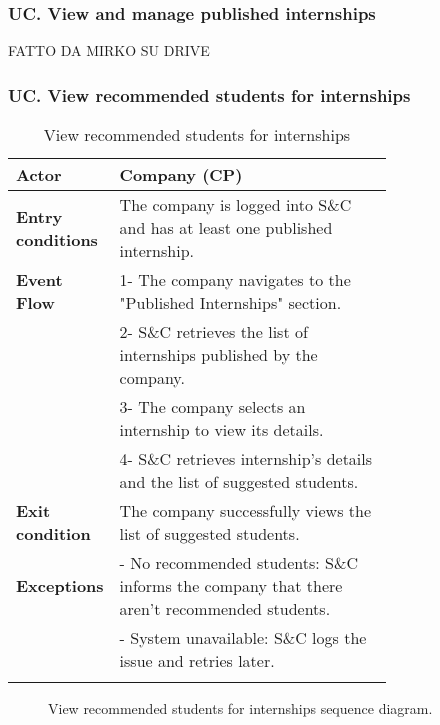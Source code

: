 \subsubsection*{UC\cuc . View and manage published internships}
FATTO DA MIRKO SU DRIVE

\subsubsection*{UC\cuc . View recommended students for internships}
\begin{center}
    \begin{longtable}{|l|p{0.75\linewidth}|}
        \hline
        \textbf{Actor}            & Company (CP)\\
        \hline
        \textbf{Entry conditions} & The company is logged into S\&C and has at least one published internship.\\
        \hline
        \textbf{Event Flow}     & 1- The company navigates to the "Published                              Internships" section. \\
                                & 2- S\&C retrieves the list of internships published by the company. \\
                                & 3- The company selects an internship to view its details. \\
                                & 4- S\&C retrieves internship's details and the list of suggested students.\\
        \hline
        \textbf{Exit condition}     & The company successfully views the list of                                suggested students.\\       
        \hline
        \textbf{Exceptions}     & - No recommended students: S\&C informs the company that there aren't recommended students. \\
                                & - System unavailable: S\&C logs the issue and retries later. \\
        \hline
        \caption{View recommended students for internships}
        \label{tab: view_recommended_students_for_internships_usecase}
    \end{longtable}
\end{center}

\begin{figure}[H]
    \begin{center}
        
        \caption{View recommended students for internships sequence diagram.}
        \label{fig:view_recommended_students_seqd}%
    \end{center}
\end{figure}

